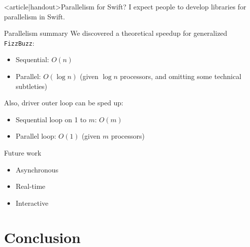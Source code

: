 \begin{frame}<article|handout>{Parallelism for Swift?}
  I expect people to develop libraries for parallelism in Swift.
\end{frame}

\begin{frame}{Parallelism summary}
  We discovered a theoretical speedup for generalized \texttt{FizzBuzz}:
  \begin{itemize}
  \item Sequential: $O(n)$
  \item Parallel: $O(\log n)$ (given $\log n$ processors, and omitting some technical subtleties)
  \end{itemize}

  Also, driver outer loop can be sped up:
  \begin{itemize}
  \item Sequential loop on 1 to $m$: $O(m)$
  \item Parallel loop: $O(1)$ (given $m$ processors)
  \end{itemize}
\end{frame}

\begin{frame}{Future work}
  \begin{itemize}
  \item Asynchronous
  \item Real-time
  \item Interactive
  \end{itemize}
\end{frame}

\section{Conclusion}

